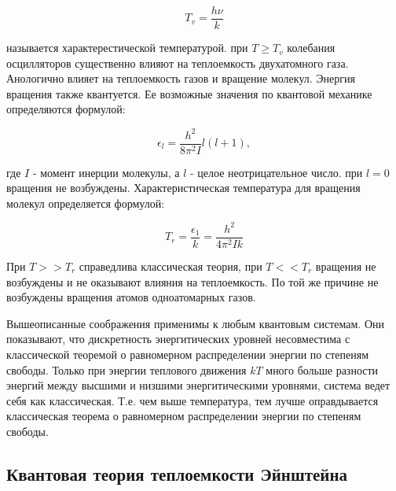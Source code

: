 \begin{equation}
    T_v = \frac {h\nu}{k}
    \label{TV}
\end{equation}

называется характерестической температурой. при $ T \geq T_v $ колебания осцилляторов существенно влияют на теплоемкость двухатомного газа. \\ [0.2cm]

Анологично влияет на теплоемкость газов и вращение молекул. Энергия вращения также квантуется. Ее возможные значения по квантовой механике определяются формулой:

\begin{equation}
    \epsilon_l = \frac {h^2}{8\pi^2I}l(l + 1),
    \label{TV}
\end{equation}

где $ I $ - момент инерции молекулы, а $ l $ - целое неотрицательное число. при $ l = 0 $ вращения не возбуждены. Характеристическая температура для вращения молекул определяется формулой:

\begin{equation}
    T_r = \frac {\epsilon_1}{k} = \frac {h^2}{4\pi^2Ik}
    \label{TV}
\end{equation}

При $ T >> T_r $ справедлива классическая теория, при $ T << T_r $ вращения не возбуждены и не оказывают влияния на теплоемкость. По той же причине не возбуждены вращения атомов одноатомарных газов. \\ [0.2cm]

\newpage

Вышеописанные соображения применимы к любым квантовым системам. Они показывают, что дискретность энергитических уровней несовместима с классической теоремой о равномерном распределении энергии по степеням свободы. Только при энергии теплового движения $ kT $ много больше разности энергий между высшими и низшими энергитическими уровнями, система ведет себя как классическая. Т.е. чем выше температура, тем лучше оправдывается классическая теорема о равномерном распределении энергии по степеням свободы.

\subsection {Квантовая теория теплоемкости Эйнштейна}